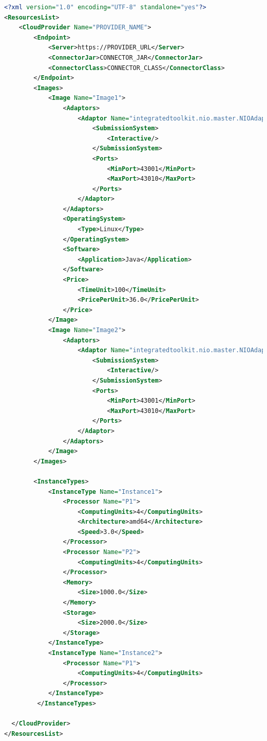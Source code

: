 \begin{lstlisting}[language=xml]
<?xml version="1.0" encoding="UTF-8" standalone="yes"?>
<ResourcesList>
    <CloudProvider Name="PROVIDER_NAME">
        <Endpoint>
            <Server>https://PROVIDER_URL</Server>
            <ConnectorJar>CONNECTOR_JAR</ConnectorJar>
            <ConnectorClass>CONNECTOR_CLASS</ConnectorClass>
        </Endpoint>
        <Images>
            <Image Name="Image1">
                <Adaptors>
                    <Adaptor Name="integratedtoolkit.nio.master.NIOAdaptor">
                        <SubmissionSystem>
                            <Interactive/>
                        </SubmissionSystem>
                        <Ports>
                            <MinPort>43001</MinPort>
                            <MaxPort>43010</MaxPort>
                        </Ports>
                    </Adaptor>
                </Adaptors>
                <OperatingSystem>
                    <Type>Linux</Type>
                </OperatingSystem>
                <Software>
                    <Application>Java</Application>
                </Software>
                <Price>
                    <TimeUnit>100</TimeUnit>
                    <PricePerUnit>36.0</PricePerUnit>
                </Price>
            </Image>
            <Image Name="Image2">
                <Adaptors>
                    <Adaptor Name="integratedtoolkit.nio.master.NIOAdaptor">
                        <SubmissionSystem>
                            <Interactive/>
                        </SubmissionSystem>
                        <Ports>
                            <MinPort>43001</MinPort>
                            <MaxPort>43010</MaxPort>
                        </Ports>
                    </Adaptor>
                </Adaptors>
            </Image>
        </Images>
    
        <InstanceTypes>
            <InstanceType Name="Instance1">
                <Processor Name="P1">
                    <ComputingUnits>4</ComputingUnits>
                    <Architecture>amd64</Architecture>
                    <Speed>3.0</Speed>
                </Processor>
                <Processor Name="P2">
                    <ComputingUnits>4</ComputingUnits>
                </Processor>
                <Memory>
                    <Size>1000.0</Size>
                </Memory>
                <Storage>
                    <Size>2000.0</Size>
                </Storage>
            </InstanceType>
            <InstanceType Name="Instance2">
                <Processor Name="P1">
                    <ComputingUnits>4</ComputingUnits>
                </Processor>
            </InstanceType>
         </InstanceTypes>

  </CloudProvider>
</ResourcesList>
\end{lstlisting}

